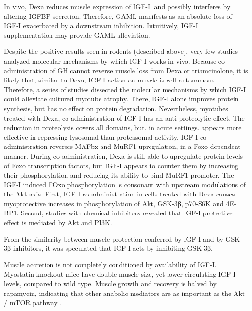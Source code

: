 \documentclass[12pt,english]{report}\usepackage[]{graphicx}\usepackage[]{color}
\begin{document}
In vivo, Dexa reduces muscle expression of IGF-I\citep{gayan-ramirez1999acute,inder2010dexamethasone},
and possibly interferes by altering IGFBP secretion\citep{wu2010redd1}.
Therefore, GAML manifests as an absolute loss of IGF-I exacerbated
by a downstream inhibition. Intuitively, IGF-I supplementation may
provide GAML alleviation.

Despite the positive results seen in rodents (described above), very
few studies analyzed molecular mechanisms by which IGF-I works in
vivo. Because co-administration of GH cannot reverse muscle loss from
Dexa or triamcinolone\citep{petrof1995growth,chrysis1999regulation},
it is likely that, similar to Dexa, IGF-I action on muscle is cell-autonomous.
Therefore, a series of studies dissected the molecular mechanisms
by which IGF-I could alleviate cultured myotube atrophy. There, IGF-I
alone improves protein synthesis, but has no effect on protein degradation\citep{quinn2007muscle-specific}.
Nevertheless, myotubes treated with Dexa, co-administration of IGF-I
has an anti-proteolytic effect\citep{quinn2007muscle-specific}. The
reduction in proteolysis covers all domains, but, in acute settings,
appears more effective in repressing lysosomal than proteasomal activity\citep{li2004insulin-like}.
IGF-I co-administration reverses MAFbx and MuRF1 upregulation\citep{sacheck2004igf-i,waddell2008glucocorticoid},
in a Foxo dependent manner. During co-administration, Dexa is still
able to upregulate protein levels of Foxo transcription factors, but
IGF-I appears to counter them by increasing their phosphorylation\citep{stitt2004igf-1/pi3k/akt}
and reducing its ability to bind MuRF1 promoter\citep{waddell2008glucocorticoid}.
The IGF-I induced FOxo phosphorylation is consonant with upstream
modulations of the Akt axis. First, IGF-I co-administration in cells
treated with Dexa causes myoprotective increases in phosphorylation
of Akt, GSK-3β, p70-S6K and 4E-BP1\citep{li2005insulin-like,shah2000translational}.
Second, studies with chemical inhibitors revealed that IGF-I protective
effect is mediated by Akt and PI3K\citep{li2005insulin-like}.

From the similarity between muscle protection conferred by IGF-I and
by GSK-3β inhibitors, it was speculated that IGF-I acts by inhibiting
GSK-3β\citep{evenson2005gsk-3beta,schakman2008role}.

Muscle accretion is not completely conditioned by availability of
IGF-I. Myostatin knockout mice have double muscle size, yet lower
circulating IGF-I levels, compared to wild type\citep{williams2011endocrine}.
Muscle growth and recovery is halved by rapamycin, indicating that
other anabolic mediators are as important as the Akt / mTOR pathway
\citep{pallafacchina2002protein,bodine2001akt/mtor,spangenburg2008functional}.
\end{document}
